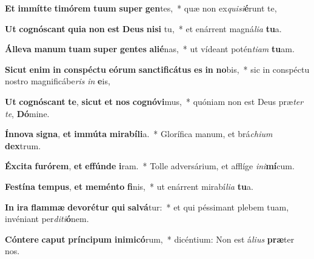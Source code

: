 \item \textbf{Et} \textbf{im}\textbf{mít}\textbf{te} \textbf{ti}\textbf{mó}\textbf{rem} \textbf{tu}\textbf{um} \textbf{su}\textbf{per} \textbf{gen}tes,~* quæ non ex\textit{qui}\textit{si}\textbf{é}runt te,
\item \textbf{Ut} \textbf{co}\textbf{gnós}\textbf{cant} \textbf{qui}\textbf{a} \textbf{non} \textbf{est} \textbf{De}\textbf{us} \textbf{ni}\textbf{si} tu,~* et enárrent magná\textit{li}\textit{a} \textbf{tu}a.
\item \textbf{Ál}\textbf{le}\textbf{va} \textbf{ma}\textbf{num} \textbf{tu}\textbf{am} \textbf{su}\textbf{per} \textbf{gen}\textbf{tes} \textbf{a}\textbf{li}\textbf{é}nas,~* ut vídeant potén\textit{ti}\textit{am} \textbf{tu}am.
\item \textbf{Sic}\textbf{ut} \textbf{e}\textbf{nim} \textbf{in} \textbf{con}\textbf{spéc}\textbf{tu} \textbf{e}\textbf{ó}\textbf{rum} \textbf{sanc}\textbf{ti}\textbf{fi}\textbf{cá}\textbf{tus} \textbf{es} \textbf{in} \textbf{no}bis,~* sic in conspéctu nostro magnificábe\textit{ris} \textit{in} \textbf{e}is,
\item \textbf{Ut} \textbf{co}\textbf{gnós}\textbf{cant} \textbf{te}, \textbf{sic}\textbf{ut} \textbf{et} \textbf{nos} \textbf{co}\textbf{gnó}\textbf{vi}mus,~* quóniam non est Deus præ\textit{ter} \textit{te}, \textbf{Dó}mine.
\item \textbf{Ín}\textbf{no}\textbf{va} \textbf{si}\textbf{gna}, \textbf{et} \textbf{im}\textbf{mú}\textbf{ta} \textbf{mi}\textbf{ra}\textbf{bí}\textbf{li}a.~* Glorífica manum, et brá\textit{chi}\textit{um} \textbf{dex}trum.
\item \textbf{Éx}\textbf{ci}\textbf{ta} \textbf{fu}\textbf{ró}\textbf{rem}, \textbf{et} \textbf{ef}\textbf{fún}\textbf{de} \textbf{i}ram.~* Tolle adversárium, et afflíge \textit{in}\textit{i}\textbf{mí}cum.
\item \textbf{Fes}\textbf{tí}\textbf{na} \textbf{tem}\textbf{pus}, \textbf{et} \textbf{me}\textbf{mén}\textbf{to} \textbf{fi}nis,~* ut enárrent mirabí\textit{li}\textit{a} \textbf{tu}a.
\item \textbf{In} \textbf{i}\textbf{ra} \textbf{flam}\textbf{mæ} \textbf{de}\textbf{vo}\textbf{ré}\textbf{tur} \textbf{qui} \textbf{sal}\textbf{vá}tur:~* et qui péssimant plebem tuam, invéniant per\textit{di}\textit{ti}\textbf{ó}nem.
\item \textbf{Cón}\textbf{te}\textbf{re} \textbf{ca}\textbf{put} \textbf{prín}\textbf{ci}\textbf{pum} \textbf{in}\textbf{i}\textbf{mi}\textbf{có}rum,~* dicéntium: Non est á\textit{li}\textit{us} \textbf{præ}ter nos.
